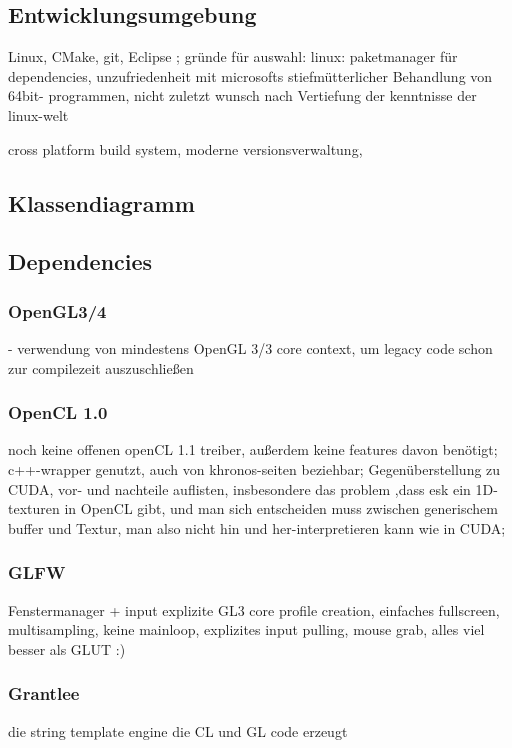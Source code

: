 
\label{sec:systemArchitecture}

\subsection{Entwicklungsumgebung}

	Linux, CMake, git, Eclipse ; 
	gründe für auswahl:
		linux:  paketmanager für dependencies, unzufriedenheit mit microsofts stiefmütterlicher Behandlung von 64bit-		
			programmen, nicht zuletzt wunsch nach Vertiefung der kenntnisse der linux-welt
	
	cross platform build system, moderne versionsverwaltung, 	
 

\subsection{Klassendiagramm}

\subsection{Dependencies}
	\label{sec:dependencies}

		
	\subsubsection{OpenGL3/4}
	
	- verwendung von mindestens OpenGL 3/3 core context, um legacy code schon zur compilezeit auszuschließen
    \subsubsection{OpenCL 1.0}
    	noch keine offenen openCL 1.1 treiber, außerdem keine features davon benötigt;
    	c++-wrapper genutzt, auch von khronos-seiten beziehbar;
    	Gegenüberstellung zu CUDA, vor- und nachteile auflisten, insbesondere das problem ,dass esk ein 1D-texturen in OpenCL gibt, und man sich entscheiden muss zwischen generischem buffer und Textur, man also nicht hin und her-interpretieren kann wie in CUDA;
    \subsubsection{GLFW}
    	Fenstermanager + input
    	explizite GL3 core profile creation, einfaches fullscreen, multisampling, keine mainloop, explizites input pulling, 
    	mouse grab, alles viel besser als GLUT :)
    \subsubsection{Grantlee}
       die string template engine die CL und GL code erzeugt
